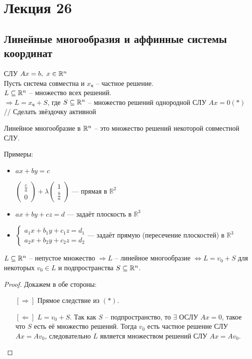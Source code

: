 \section*{Лекция 26}
%
\subsection*{Линейные многообразия и аффинные системы координат}
%
\raggedright{ СЛУ $Ax = b,~ x \in \mathbb{R}^n$} \\
Пусть система совместна и $x_\text{ч}$ -- частное решение. \\
$L \subseteq \mathbb{R}^n$ -- множество всех решений. \\ 
$\Rightarrow L = x_\text{ч} + S$, где $S \subseteq \mathbb{R}^n$ -- множество решений однородной СЛУ $Ax = 0 (*)$ // Сделать звёздочку активной

\begin{Def}
	Линейное многообразие в $\mathbb{R}^n$ -- это множество решений некоторой совместной СЛУ.
\end{Def}

Примеры:
\begin{itemize}
    \item $ax+by=c$ 
    
    $\begin{pmatrix}
    \frac c a \\ 0
    \end{pmatrix} + \lambda
    \begin{pmatrix}
    1 \\ \frac b a
    \end{pmatrix}$ --- прямая в $\mathbb{R}^2$
    \item $ax+by+cz=d$ --- задаёт плоскость в $\mathbb{R}^3$
    \item $\begin{cases}
            a_1x+b_1y+c_1z=d_1\\
            a_2x+b_2y+c_2z=d_2
        \end{cases}$--- задаёт прямую (пересечение плоскостей) в $\mathbb{R}^3$
\end{itemize}

\begin{Suggestion}
	$L \subseteq \mathbb{R}^n$ -- непустое множество $\Rightarrow L$ -- линейное многообразие $\Leftrightarrow L = v_0 + S$ для некоторых $v_0 \in L$
	 и подпространства $S \subseteq \mathbb{R}^n$.  
\end{Suggestion}
\begin{proof}
	Докажем в обе стороны:
	\begin{enumerate}
		\item[{$[\Rightarrow]$}] Прямое следствие из $(*)$. \\
		\item[{$[\Leftarrow]$}] $L = v_0 + S$. Так как $S$ -- подпространство, то $\exists$ ОСЛУ $Ax = 0$, такое что $S$ есть её множество решений. Тогда
		$v_0$ есть частное решение СЛУ $Ax = Av_0$, следовательно $L$ является множеством решений  СЛУ $Ax = Av_0$.
	\end{enumerate}
\end{proof}

